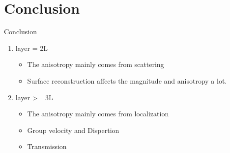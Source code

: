 \documentclass{beamer}
\begin{document}
\section{Conclusion}
\begin{frame}[label=lists]{Conclusion}

  \begin{enumerate}
    \item layer = 2L
          \begin{itemize}
            \item The anisotropy mainly comes from scattering
          \end{itemize}
          \begin{itemize}
            \item Surface reconstruction affects the magnitude and anisotropy a lot.
          \end{itemize}
    \item layer >= 3L
          \begin{itemize}
            \item The anisotropy mainly comes from localization
          \end{itemize}
          \begin{itemize}
            \item Group velocity and Dispertion
          \end{itemize}
          \begin{itemize}
            \item Transmission
          \end{itemize}
  \end{enumerate}
  \bigskip
  \justifying

\end{frame}


\end{document}
